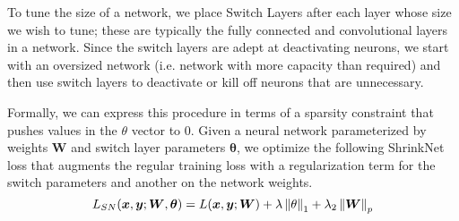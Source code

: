 To tune the size of a network, we place Switch Layers after each layer whose size
we wish to tune; these are typically the fully connected and convolutional layers
in a network.
Since the switch layers are adept at deactivating neurons, we start with an
oversized network (i.e. network with more capacity than required) and then use
switch layers to deactivate or kill off neurons that are unnecessary.

Formally, we can express this procedure in terms of a sparsity constraint that pushes
values in the $\theta$ vector to 0.
Given a neural network parameterized by weights $\bm{W}$ and switch layer 
parameters $\bm{\theta}$, we optimize the following ShrinkNet loss that 
augments the regular training loss with a 
regularization term for the switch parameters and another on the network weights.
\begin{equation}
  L_{SN}(\bm{x},\bm{y};\bm{W}, \bm{\theta}) = L(\bm{x}, \bm{y}; \bm{W}) +
  \lambda\left\lVert\theta\right\rVert_1 + \lambda_2\left\lVert\bm{W}\right\rVert_p
\end{equation}


